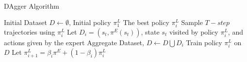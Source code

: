 \begin{algorithm}
\caption{DAgger Algorithm \cite{ross2011dagger}}\label{alg:dagger}
\begin{algorithmic}
\Require Initial Dataset $D \leftarrow \emptyset$, Initial policy $\pi^{L}_{1}$
\Ensure The best policy $\pi^{L}_{i}$
    \State Sample $T-step$ trajectories using $\pi^{L}_{i}$
    \State Let $D_{i} = {(s_{t}, \pi^{E}(s_{t}))}$, state $s_{t}$ visited by policy $\pi^{L}_{i}$, 
    \State and actions given by the expert
    \State Aggregate Dataset, $D \leftarrow D \bigcup D_{i}$
    \State Train policy $\pi^{L}_{i}$ on $D$
    \State Let $\pi^{L}_{i+1} = \beta_{i}\pi^{E} + (1- \beta_{i})\pi^{L}_{i}$
\EndFor
\end{algorithmic}
\end{algorithm}